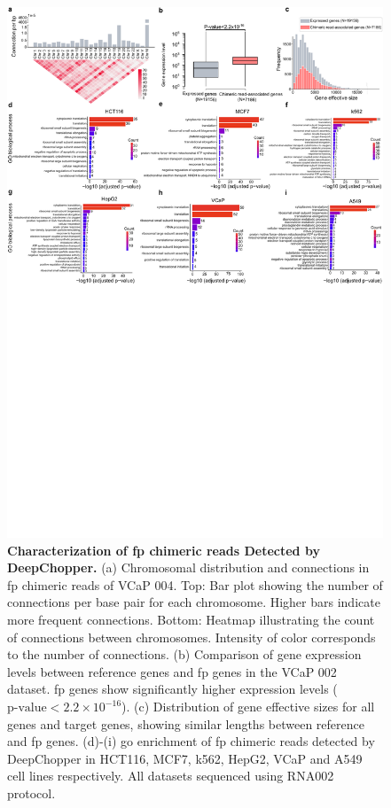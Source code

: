 \documentclass[pdflatex,sn-nature, lineno]{sn-jnl}%
\theoremstyle{thmstyleone}%
\theoremstyle{thmstyletwo}%
\theoremstyle{thmstylethree}%
\begin{document}
\begin{figure}[!h]
	\includegraphics[height=0.73\columnwidth]{finals/sf2}
	\caption{ {\bf Characterization of \gls{fp} chimeric reads Detected by DeepChopper.} (a) Chromosomal distribution and connections in \gls{fp} chimeric reads of VCaP 004. Top: Bar plot showing the number of connections per base pair for each chromosome. Higher bars indicate more frequent connections. Bottom: Heatmap illustrating the count of connections between chromosomes. Intensity of color corresponds to the number of connections. (b) Comparison of gene expression levels between reference genes and \gls{fp} genes in the VCaP 002 dataset. \gls{fp} genes show significantly higher expression levels (\(\textrm{p-value} < 2.2 \times 10^{-16}\)). (c) Distribution of gene effective sizes for all genes and target genes, showing similar lengths between reference and \gls{fp} genes. (d)-(i) \gls{go} enrichment of \gls{fp} chimeric reads detected by DeepChopper in HCT116, MCF7, k562, HepG2, VCaP and A549 cell lines respectively. All datasets sequenced using RNA002 protocol.}\label{fig:sf2}
\end{figure}
\end{document}
